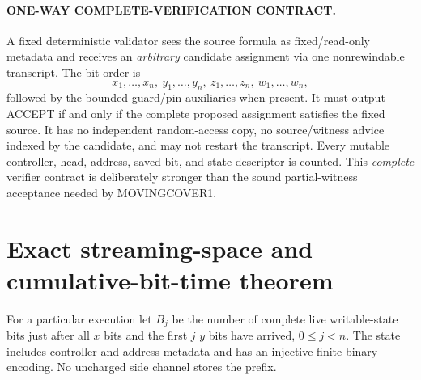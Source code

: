 \documentclass[11pt]{article}
\begin{document}
\paragraph{ONE-WAY COMPLETE-VERIFICATION CONTRACT.}
A fixed deterministic validator sees the source formula as fixed/read-only metadata and receives an \emph{arbitrary} candidate assignment via one nonrewindable transcript. The bit order is
\[
 x_1,\ldots,x_n,\ y_1,\ldots,y_n,\ z_1,\ldots,z_n,\ w_1,\ldots,w_n,
\]
followed by the bounded guard/pin auxiliaries when present. It must output ACCEPT if and only if the complete proposed assignment satisfies the fixed source. It has no independent random-access copy, no source/witness advice indexed by the candidate, and may not restart the transcript. Every mutable controller, head, address, saved bit, and state descriptor is counted. This \emph{complete} verifier contract is deliberately stronger than the sound partial-witness acceptance needed by MOVINGCOVER1.

\section{Exact streaming-space and cumulative-bit-time theorem}
For a particular execution let $B_j$ be the number of complete live writable-state bits just after all $x$ bits and the first $j$ $y$ bits have arrived, $0\le j<n$. The state includes controller and address metadata and has an injective finite binary encoding. No uncharged side channel stores the prefix.
\end{document}
